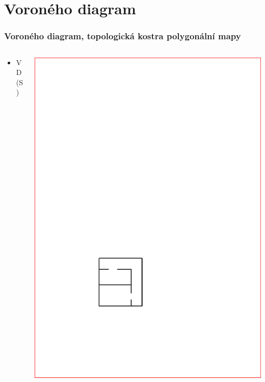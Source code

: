 \documentclass[notes=false,pdftex]{beamer}
\begin{document}
\section{Voroného diagram}
\begin{frame}
	\frametitle{Voroného diagram, topologická kostra polygonální mapy}

	\begin{columns}[T]
		\begin{column}{0.5\textwidth}
			\begin{itemize}
				\item VD(S)
			\end{itemize}
		\end{column}
		\begin{column}{0.5\textwidth}
			\includegraphics[width=1\textwidth,clip=true,trim=147pt 165pt 289pt 502pt]{images/vd_01.pdf} 
		\end{column}
	\end{columns}
\end{frame}
\end{document}
